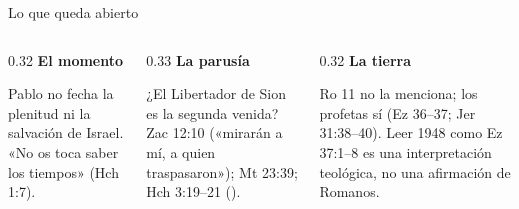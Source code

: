 \begin{frame}{Lo que queda abierto}
\begin{columns}[T,onlytextwidth]
\begin{column}{0.32\textwidth}\small\RaggedRight
\textbf{\textcolor{ladrillo}{El momento}}\par\smallskip
Pablo no fecha la plenitud ni la salvación de Israel. «No os toca saber los tiempos» (Hch 1:7).
\end{column}
\begin{column}{0.33\textwidth}\small\RaggedRight
\textbf{\textcolor{ladrillo}{La parusía}}\par\smallskip
¿El Libertador de Sion es la segunda venida? Zac 12:10 («mirarán a mí, a quien traspasaron»); Mt 23:39; Hch 3:19--21 ().
\end{column}
\begin{column}{0.32\textwidth}\small\RaggedRight
\textbf{\textcolor{ladrillo}{La tierra}}\par\smallskip
Ro 11 no la menciona; los profetas sí (Ez 36--37; Jer 31:38--40). Leer 1948 como Ez 37:1--8 es una interpretación teológica, no una afirmación de Romanos.
\end{column}
\end{columns}\vspace{8pt}
\centering
{}\par
\elabpropia
\end{frame}

